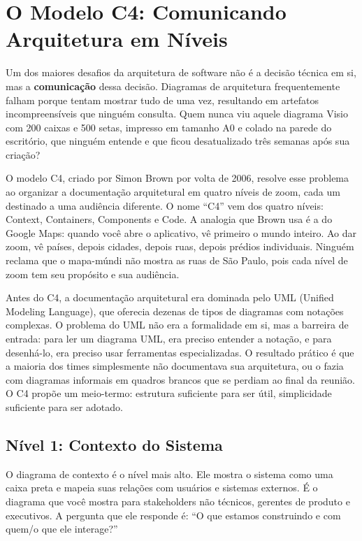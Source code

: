 \section{O Modelo C4: Comunicando Arquitetura em Níveis}

Um dos maiores desafios da arquitetura de software não é a decisão técnica em
si, mas a \textbf{comunicação} dessa decisão. Diagramas de arquitetura
frequentemente falham porque tentam mostrar tudo de uma vez, resultando em
artefatos incompreensíveis que ninguém consulta. Quem nunca viu aquele diagrama
Visio com 200 caixas e 500 setas, impresso em tamanho A0 e colado na parede do
escritório, que ninguém entende e que ficou desatualizado três semanas após sua
criação?

O modelo C4, criado por Simon Brown por volta de 2006, resolve esse problema ao
organizar a documentação arquitetural em quatro níveis de zoom, cada um destinado
a uma audiência diferente. O nome ``C4'' vem dos quatro níveis: Context,
Containers, Components e Code. A analogia que Brown usa é a do Google Maps:
quando você abre o aplicativo, vê primeiro o mundo inteiro. Ao dar zoom, vê
países, depois cidades, depois ruas, depois prédios individuais. Ninguém
reclama que o mapa-múndi não mostra as ruas de São Paulo, pois cada nível de
zoom tem seu propósito e sua audiência.

Antes do C4, a documentação arquitetural era dominada pelo UML (Unified Modeling
Language), que oferecia dezenas de tipos de diagramas com notações complexas.
O problema do UML não era a formalidade em si, mas a barreira de entrada: para
ler um diagrama UML, era preciso entender a notação, e para desenhá-lo, era
preciso usar ferramentas especializadas. O resultado prático é que a maioria
dos times simplesmente não documentava sua arquitetura, ou o fazia com
diagramas informais em quadros brancos que se perdiam ao final da reunião. O
C4 propõe um meio-termo: estrutura suficiente para ser útil, simplicidade
suficiente para ser adotado.

\subsection{Nível 1: Contexto do Sistema}

O diagrama de contexto é o nível mais alto. Ele mostra o sistema como uma caixa
preta e mapeia suas relações com usuários e sistemas externos. É o diagrama que
você mostra para stakeholders não técnicos, gerentes de produto e executivos.
A pergunta que ele responde é: ``O que estamos construindo e com quem/o que
ele interage?''


